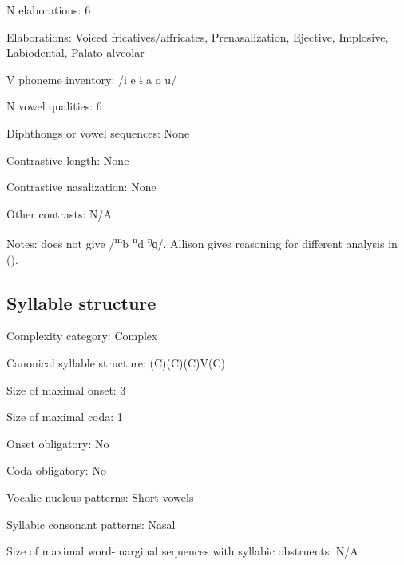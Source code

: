 {\begin{appendixdesc}
\item[N elaborations:] 6

\item[Elaborations:] Voiced fricatives/affricates, Prenasalization, Ejective, Implosive, Labiodental, Palato-alveolar

\item[V phoneme inventory:] /i e ɨ a o u/

\item[N vowel qualities:] 6

\item[Diphthongs or vowel sequences:] None

\item[Contrastive length:] None

\item[Contrastive nasalization:] None

\item[Other contrasts:] N/A

\item[Notes:] \citet{Mahamat2005} does not give /\textsuperscript{m}b \textsuperscript{n}d \textsuperscript{ŋ}ɡ/. Allison gives reasoning for different analysis in (\citeyear[17--20]{Allison2012}).
\end{appendixdesc}
\subsection*{Syllable structure}
\begin{appendixdesc}

\item[Complexity category:] Complex

\item[Canonical syllable structure:] (C)(C)(C)V(C) \citep[23--24]{Allison2012}

\item[Size of maximal onset:] 3

\item[Size of maximal coda:] 1

\item[Onset obligatory:] No

\item[Coda obligatory:] No

\item[Vocalic nucleus patterns:] Short vowels

\item[Syllabic consonant patterns:] Nasal

\item[Size of maximal word-marginal sequences with syllabic obstruents:] N/A


\end{appendixdesc}}
